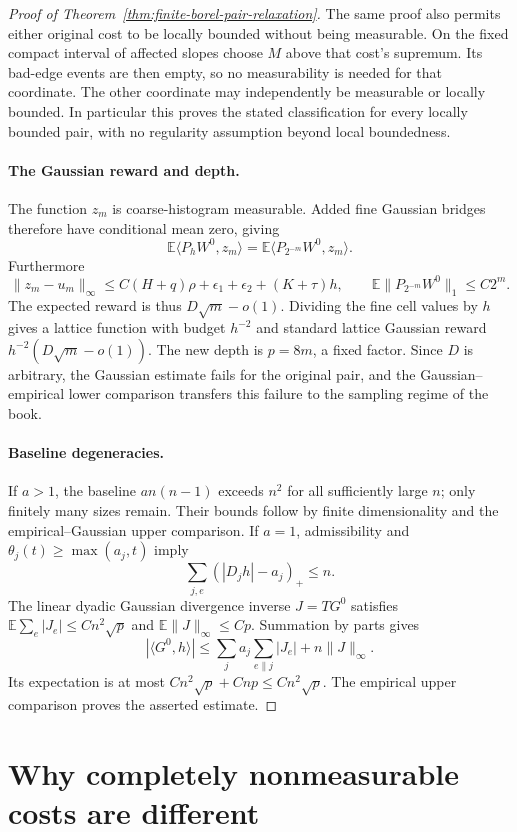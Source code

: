 \documentclass[11pt]{article}
\numberwithin{equation}{section}
\begin{document}
\begin{proof}[Proof of Theorem~\ref{thm:finite-borel-pair-relaxation}]
The same proof also permits either original cost to be locally bounded
without being measurable. On the fixed compact interval of affected
slopes choose $M$ above that cost's supremum. Its bad-edge events are
then empty, so no measurability is needed for that coordinate. The other
coordinate may independently be measurable or locally bounded. In
particular this proves the stated classification for every locally
bounded pair, with no regularity assumption beyond local boundedness.

\paragraph{The Gaussian reward and depth.}
The function $z_m$ is coarse-histogram measurable. Added fine
Gaussian bridges therefore have conditional mean zero, giving
\[
 \mathbb E\langle P_hW^0,z_m\rangle
       =\mathbb E\langle P_{2^{-m}}W^0,z_m\rangle.
\]
Furthermore
\[
 \|z_m-u_m\|_\infty
 \le C(H+q)\rho+\epsilon_1+\epsilon_2+(K+\tau)h,
 \qquad \mathbb E\|P_{2^{-m}}W^0\|_1\le C2^m.
\]
The expected reward is thus $D\sqrt m-o(1)$. Dividing the fine cell
values by $h$ gives a lattice function with budget $h^{-2}$ and
standard lattice Gaussian reward $h^{-2}(D\sqrt m-o(1))$.
The new depth is $p=8m$, a fixed factor. Since $D$ is arbitrary,
the Gaussian estimate fails for the original pair, and the
Gaussian--empirical lower comparison transfers this failure to the
sampling regime of the book.

\paragraph{Baseline degeneracies.}
If $a>1$, the baseline $a n(n-1)$ exceeds $n^2$ for all sufficiently
large $n$; only finitely many sizes remain. Their bounds follow by
finite dimensionality and the empirical--Gaussian upper comparison.
If $a=1$, admissibility and $\theta_j(t)\ge\max(a_j,t)$ imply
\[
 \sum_{j,e}(|D_jh|-a_j)_+\le n.
\]
The linear dyadic Gaussian divergence inverse $J=TG^0$ satisfies
$\mathbb E\sum_e|J_e|\le Cn^2\sqrt p$ and
$\mathbb E\|J\|_\infty\le Cp$. Summation by parts gives
\[
 |\langle G^0,h\rangle|
 \le\sum_j a_j\sum_{e\parallel j}|J_e|+n\|J\|_\infty.
\]
Its expectation is at most $Cn^2\sqrt p+Cnp\le Cn^2\sqrt p$.
The empirical upper comparison proves the asserted estimate.
\end{proof}



\section{Why completely nonmeasurable costs are different}
\end{document}
